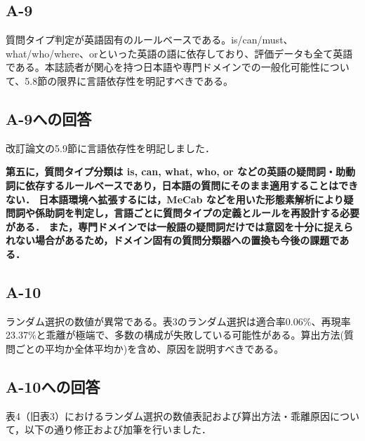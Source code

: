 \documentclass{jsarticle}
\begin{document}
\subsection*{A-9}
\begin{screen}
質問タイプ判定が英語固有のルールベースである。is/can/must、what/who/where、orといった英語の語に依存しており、評価データも全て英語である。本誌読者が関心を持つ日本語や専門ドメインでの一般化可能性について、5.8節の限界に言語依存性を明記すべきである。
\end{screen}

\subsection*{A-9への回答}
改訂論文の5.9節に言語依存性を明記しました．

\textbf{第五に，質問タイプ分類は is, can, what, who, or などの英語の疑問詞・助動詞に依存するルールベースであり，日本語の質問にそのまま適用することはできない．
日本語環境へ拡張するには，MeCab などを用いた形態素解析により疑問詞や係助詞を判定し，言語ごとに質問タイプの定義とルールを再設計する必要がある．
また，専門ドメインでは一般語の疑問詞だけでは意図を十分に捉えられない場合があるため，ドメイン固有の質問分類器への置換も今後の課題である．}

\subsection*{A-10}
\begin{screen}
ランダム選択の数値が異常である。表3のランダム選択は適合率0.06\%、再現率23.37\%と乖離が極端で、多数の構成が失敗している可能性がある。算出方法(質問ごとの平均か全体平均か)を含め、原因を説明すべきである。
\end{screen}

\subsection*{A-10への回答}
表4（旧表3）におけるランダム選択の数値表記および算出方法・乖離原因について，以下の通り修正および加筆を行いました．
\end{document}
